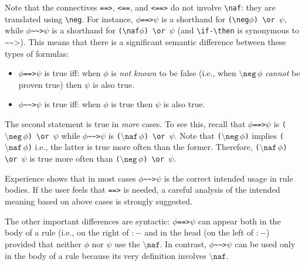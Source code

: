\documentclass[11pt]{article}
\newcommand{\rnafarr}{\texttt{\textasciitilde\textasciitilde>}}
\newcommand{\rnegarr}{\texttt{==>}}
\newcommand{\bs}{\textbackslash}
\newcommand{\RULELOGNAF}{{\texttt{{\bs}naf}}\xspace}
\newcommand{\RULELOGNEG}{{\texttt{{\bs}neg}}\xspace}
\begin{document}
\index{\rnafarr vs. \texttt{==>} vs. \texttt{:-}}
Note that the connectives \texttt{==>}, \texttt{<==}, and \texttt{<==>} do
not involve \texttt{\RULELOGNAF}: they are translated using \texttt{\RULELOGNEG}. For
instance, \texttt{$\phi$==>$\psi$} is a shorthand for
\texttt{(\RULELOGNEG $\phi$) \bs{}or $\psi$}, while
$\phi$\rnafarr$\psi$ is a shorthand for \texttt{(\RULELOGNAF $\phi$) \bs{}or
  $\psi$} (and \texttt{\bs{}if-\bs{}then} is synonymous to $\rnafarr$).
This means that there is a significant semantic difference between these
types of formulas:
\begin{itemize}
\item \texttt{$\phi$==>$\psi$} is true iff:  when
  $\phi$ is \emph{not known}   to be false
  (i.e., when $\RULELOGNEG\,\phi$ \emph{cannot} be proven true) then $\psi$ is also true.
\item $\phi$\rnafarr$\psi$ is true iff:  when
  $\phi$ is true then $\psi$ is also true.
\end{itemize}
The second statement is true in \emph{more} cases.  To see this, recall
that \texttt{$\phi$==>$\psi$} is
\texttt{($\RULELOGNEG\,\phi$)\,\bs{}or\,$\psi$} while $\phi$\rnafarr$\psi$
is \texttt{($\RULELOGNAF\,\phi$)\,\bs{}or\,$\psi$}. Note that
\texttt{($\RULELOGNEG\,\phi$)} implies \texttt{($\RULELOGNAF\,\phi$)} i.e.,
the latter is true more often than the former. Therefore,
\texttt{($\RULELOGNAF\,\phi$)\,\bs{}or\,$\psi$} is true more often than
\texttt{($\RULELOGNEG\,\phi$)\,\bs{}or $\psi$}.

Experience shows that in most cases
$\phi$\rnafarr$\psi$ is the correct intended usage
in rule bodies. If the user feels that \texttt{==>} is needed, a careful
analysis of the intended meaning based on above cases is strongly suggested. 

The other important differences are syntactic: $\phi$\rnegarr$\psi$
can appear both in the body of a rule (i.e., on the right of $:-$ and in
the head (on the left of \texttt{$:-$}) provided that neither $\phi$ nor $\psi$ use
the $\RULELOGNAF$. In contrast, $\phi$\rnafarr$\psi$ can be used only in
the body of a rule because its very definition involves $\RULELOGNAF$.
\end{document}
